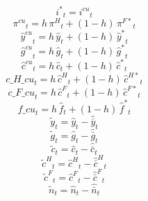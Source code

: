 \begin{dmath}
{{i^*}}_{t}={{i^{cu}}}_{t}
\end{dmath}
\begin{dmath}
{{\pi^{cu}}}_{t}={{h}}\, {{\pi^H}}_{t}+\left(1-{{h}}\right)\, {{\pi^{F*}}}_{t}
\end{dmath}
\begin{dmath}
{{\hat y^{cu}}}_{t}={{h}}\, {{\hat y}}_{t}+\left(1-{{h}}\right)\, {{\hat y^*}}_{t}
\end{dmath}
\begin{dmath}
{{\hat g^{cu}}}_{t}={{h}}\, {{\hat g}}_{t}+\left(1-{{h}}\right)\, {{\hat g^*}}_{t}
\end{dmath}
\begin{dmath}
{{\hat c^{cu}}}_{t}={{h}}\, {{\hat c}}_{t}+\left(1-{{h}}\right)\, {{\hat c^*}}_{t}
\end{dmath}
\begin{dmath}
{c\_H\_cu}_{t}={{h}}\, {{\hat c^H}}_{t}+\left(1-{{h}}\right)\, {{\hat c^{H*}}}_{t}
\end{dmath}
\begin{dmath}
{c\_F\_cu}_{t}={{h}}\, {{\hat c^F}}_{t}+\left(1-{{h}}\right)\, {{\hat c^{F*}}}_{t}
\end{dmath}
\begin{dmath}
{f\_cu}_{t}={{h}}\, {{\hat f}}_{t}+\left(1-{{h}}\right)\, {{\hat f^*}}_{t}
\end{dmath}
\begin{dmath}
{{\tilde y}}_{t}={{\hat y}}_{t}-{{\hat {\bar y}}}_{t}
\end{dmath}
\begin{dmath}
{{\tilde g}}_{t}={{\hat g}}_{t}-{{\hat {\bar g}}}_{t}
\end{dmath}
\begin{dmath}
{{\tilde c}}_{t}={{\hat c}}_{t}-{{\hat {\bar c}}}_{t}
\end{dmath}
\begin{dmath}
{{\tilde c^H}}_{t}={{\hat c^H}}_{t}-{{\hat {\bar c}^H}}_{t}
\end{dmath}
\begin{dmath}
{{\tilde c^F}}_{t}={{\hat c^F}}_{t}-{{\hat {\bar c}^F}}_{t}
\end{dmath}
\begin{dmath}
{{\tilde n}}_{t}={{\hat n}}_{t}-{{\hat {\bar n}}}_{t}
\end{dmath}
